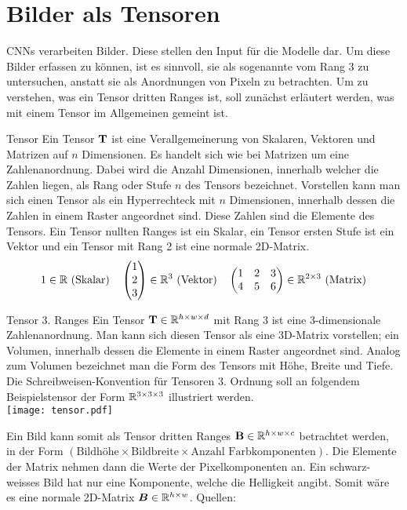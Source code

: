 \section{Bilder als Tensoren}\label{sec:tensor}
CNNs verarbeiten Bilder. Diese stellen den Input für die Modelle dar.
Um diese Bilder erfassen zu können, ist es sinnvoll, sie als sogenannte
 vom Rang 3 zu untersuchen, anstatt sie als Anordnungen von
Pixeln zu betrachten. Um zu verstehen, was ein Tensor dritten Ranges ist,
soll zunächst erläutert werden, was mit einem Tensor im Allgemeinen gemeint ist.

\begin{defbox}{Tensor}
  Ein Tensor $\mathbf{T}$ ist eine Verallgemeinerung von Skalaren, Vektoren und Matrizen auf
  $n$ Dimensionen. Es handelt sich wie bei Matrizen um
  eine Zahlenanordnung. Dabei wird die Anzahl Dimensionen, innerhalb welcher die
  Zahlen liegen, als Rang oder Stufe $n$ des Tensors bezeichnet. Vorstellen kann man sich einen Tensor
  als ein Hyperrechteck mit $n$ Dimensionen, innerhalb dessen die Zahlen in
  einem Raster angeordnet sind. Diese Zahlen sind die Elemente des Tensors.
  Ein Tensor nullten Ranges ist ein Skalar, ein Tensor ersten Stufe ist ein
  Vektor und ein Tensor mit Rang 2 ist eine normale 2D-Matrix.
  \begin{gather*}
    1 \in \mathbb{R} \text{ (Skalar)} \quad \begin{pmatrix} 1 \\ 2 \\ 3 \end{pmatrix}
    \in \mathbb{R}^3 \text{ (Vektor)} \quad
    \begin{pmatrix}
      1 & 2 & 3 \\
      4 & 5 & 6 \\
    \end{pmatrix} \in \mathbb{R}^{2 \times 3} \text{ (Matrix)}
  \end{gather*}
\end{defbox}

\begin{defbox}{Tensor 3. Ranges}
  Ein Tensor $\mathbf{T} \in \mathbb{R}^{h \times w \times d}$ mit Rang 3 ist eine 3-dimensionale Zahlenanordnung. Man kann sich
  diesen Tensor als eine 3D-Matrix vorstellen; ein Volumen, innerhalb
  dessen die Elemente in einem Raster angeordnet sind.
  Analog zum Volumen bezeichnet man die Form des Tensors mit Höhe, Breite und
  Tiefe.
  \para{}
  Die Schreibweisen-Konvention für Tensoren 3. Ordnung soll an folgendem
  Beispielstensor der Form $\mathbb{R}^{3 \times 3 \times 3}$ illustriert werden. \\
  \texttt{[image: tensor.pdf]}

\end{defbox}
\para{}
Ein Bild kann somit als Tensor dritten Ranges $\mathbf{B} \in \mathbb{R}^{h
  \times w \times c}$ betrachtet werden, in der Form $(\text{Bildhöhe} \times \text{Bildbreite}
\times \text{Anzahl Farbkomponenten})$.
Die Elemente der Matrix nehmen dann die Werte der Pixelkomponenten an.
Ein schwarz-weisses Bild hat nur eine Komponente, welche die Helligkeit angibt.
Somit wäre es eine normale 2D-Matrix $\bm{B} \in \mathbb{R}^{h \times w}$.
\para{}
Quellen: \cite{deeplearning.ai:cnn} \cite{wiki:tensor}

